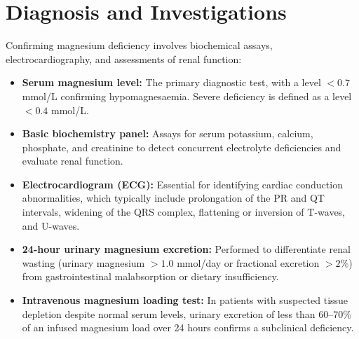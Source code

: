 \section*{Diagnosis and Investigations}
Confirming magnesium deficiency involves biochemical assays, electrocardiography, and assessments of renal function:
\begin{itemize}
    \item \textbf{Serum magnesium level:} The primary diagnostic test, with a level $<0.7$ mmol/L confirming hypomagnesaemia. Severe deficiency is defined as a level $<0.4$ mmol/L.
    \item \textbf{Basic biochemistry panel:} Assays for serum potassium, calcium, phosphate, and creatinine to detect concurrent electrolyte deficiencies and evaluate renal function.
    \item \textbf{Electrocardiogram (ECG):} Essential for identifying cardiac conduction abnormalities, which typically include prolongation of the PR and QT intervals, widening of the QRS complex, flattening or inversion of T-waves, and U-waves.
    \item \textbf{24-hour urinary magnesium excretion:} Performed to differentiate renal wasting (urinary magnesium $>1.0$ mmol/day or fractional excretion $>2\%$) from gastrointestinal malabsorption or dietary insufficiency.
    \item \textbf{Intravenous magnesium loading test:} In patients with suspected tissue depletion despite normal serum levels, urinary excretion of less than 60--70\% of an infused magnesium load over 24 hours confirms a subclinical deficiency.
\end{itemize}

